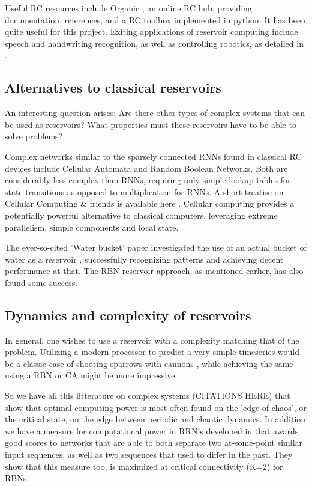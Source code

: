 Useful RC resources include Organic \cite{organic}, an online RC hub,
providing documentation, references, and a RC toolbox implemented in python.
It has been quite useful for this project.
Exiting applications of reservoir computing include speech and handwriting recognition,
as well as controlling robotics, as detailed in \cite{lukovsevivcius2012reservoir}.

\subsection{Alternatives to classical reservoirs}

An interesting question arises:
Are there other types of complex systems that can be used as reservoirs?
What properties must these reservoirs have to be able to solve problems?

Complex networks similar to the sparsely connected RNNs found in classical RC devices include Cellular Automata and Random Boolean Networks.
Both are considerably less complex than RNNs, requiring only simple lookup tables for state transitions as opposed to multiplication for RNNs.
A short treatise on Cellular Computing \& friends is available here \cite{sipper1999emergence}.
Cellular computing provides a potentially powerful alternative to classical computers,
leveraging extreme parallelism, simple components and local state.

The ever-so-cited 'Water bucket' paper investigated the use of an actual bucket of water as a reservoir \cite{fernando2003pattern},
successfully recognizing patterns and achieving decent performance at that.
The RBN-reservoir approach, as mentioned earlier, has also found some success.

\subsection{Dynamics and complexity of reservoirs}

In general, one wishes to use a reservoir with a complexity matching that of the problem.
Utilizing a modern processor to predict a very simple timeseries would be a classic case of shooting sparrows with cannons \cite{wiki:sparrow},
while achieving the same using a RBN or CA might be more impressive.


So we have all this litterature on complex systems (CITATIONS HERE) that show that optimal computing power is most often found on the 'edge of chaos', or the critical state, on the edge between periodic and chaotic dynamics.
In addition we have a measure for computational power in RRN's developed in \cite{rbn-reservoir} that awards good scores to networks that are able to both separate two at-some-point similar input sequences, as well as two sequences that used to differ in the past.
They show that this measure too, is maximized at critical connectivity (K=2) for RBNs.

